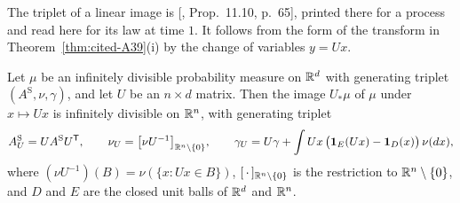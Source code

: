 The triplet of a linear image is [, Prop.~11.10, p.~65], printed there for a
\Levy{} process and read here for its law at time $1$. It follows from the form of the transform in
Theorem~\ref{thm:cited-A39}(i) by the change of variables $y = Ux$.

\begin{theorem}
\label{thm:cited-A42}

Let $\mu$ be an infinitely divisible probability measure on $\mathbb{R}^d$ with generating triplet
$(A^{\mathrm S}, \nu, \gamma)$, and let $U$ be an $n \times d$ matrix. Then the image $U_*\mu$ of $\mu$ under
$x \mapsto Ux$ is infinitely divisible on $\mathbb{R}^n$, with generating triplet
\[
  A^{\mathrm S}_U = UA^{\mathrm S}U^{\mathsf{T}}, \qquad \nu_U = \bigl[\nu U^{-1}\bigr]_{\mathbb{R}^n \setminus \{0\}}, \qquad
  \gamma_U = U\gamma + \int Ux\,\bigl(\mathbf{1}_E(Ux) - \mathbf{1}_D(x)\bigr)\,\nu(dx),
\]
where $(\nu U^{-1})(B) = \nu(\{x : Ux \in B\})$, $[\,\cdot\,]_{\mathbb{R}^n \setminus \{0\}}$ is the
restriction to $\mathbb{R}^n \setminus \{0\}$, and $D$ and $E$ are the closed unit balls of $\mathbb{R}^d$ and
$\mathbb{R}^n$.
\end{theorem}

